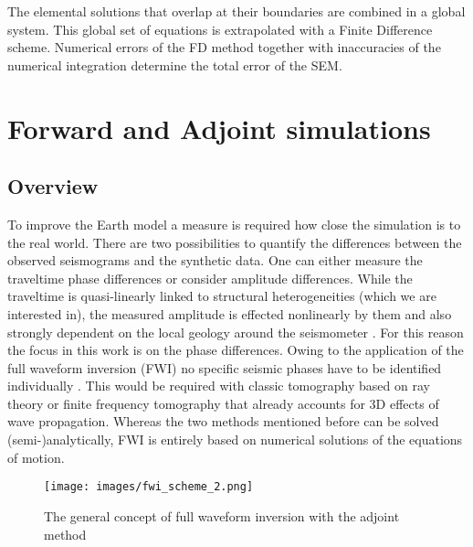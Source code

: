 The elemental solutions that overlap at their boundaries are combined in a global system. 
This global set of equations is extrapolated with a Finite Difference scheme.
Numerical errors of the FD method together with inaccuracies of the numerical integration determine the total error of the SEM.



\section{Forward and Adjoint simulations}


\subsection{Overview}
To improve the Earth model a measure is required how close the simulation is to the real world. 
There are two possibilities to quantify the differences between the observed seismograms and the synthetic data.
One can either measure the traveltime phase differences or consider amplitude differences.
While the traveltime is quasi-linearly linked to structural heterogeneities (which we are interested in),
the measured amplitude is effected nonlinearly by them and also strongly dependent on the local geology 
around the seismometer \citep{Fichtner2008}.
For this reason the focus in this work is on the phase differences.
Owing to the application of the full waveform inversion (FWI) no specific seismic phases have to be identified 
individually \citep{Fichtner2011}. 
This would be required with classic tomography based on ray theory or finite frequency tomography that already 
accounts for 3D effects of wave propagation. %
Whereas the two methods mentioned before can be solved (semi-)analytically, FWI is entirely based on numerical
solutions of the equations of motion.

\begin{figure}[h]
\begin{center}
\texttt{[image: images/fwi\_scheme\_2.png]}
\caption{The general concept of full waveform inversion with the adjoint method}
\label{adjoint_scheme}
\end{center}
\end{figure}


